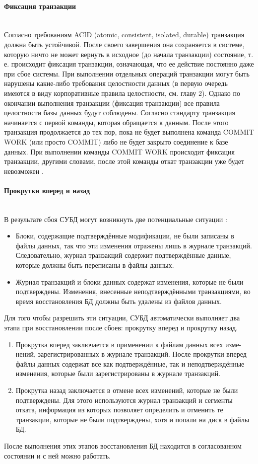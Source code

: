 \paragraph{Фиксация транзакции} ~\\
Согласно требованиям ACID (atomic, consistent, isolated, durable) транзакция должна быть устойчивой. После своего завершения она сохраняется в системе, которую ничто не может вернуть в исходное (до начала транзакции) состояние, т. е. происходит фиксация транзакции, означающая, что ее действие постоянно даже при сбое системы. При выполнении отдельных операций транзакции могут быть нарушены какие-либо требования целостности данных (в первую очередь имеются в виду корпоративные правила целостности, см. главу 2). Однако по окончании выполнения транзакции (фиксация транзакции) все правила целостности базы данных будут соблюдены.
Согласно стандарту транзакция начинается с первой команды, которая обращается к данным. После этого транзакция продолжается до тех пор, пока не будет выполнена команда COMMIT WORK (или просто COMMIT) либо не будет закрыто соединение к базе данных. При выполнении команды COMMIT WORK происходит фиксация транзакции, другими словами, после этой команды откат транзакции уже будет невозможен \autocite{Pirogov2009}.

\paragraph{Прокрутки вперед и назад} ~\\
В результате сбоя СУБД могут возникнуть две потенциальные ситуации \autocite{Karpova2009}:
\begin{itemize}
\item Блоки, содержащие подтверждённые модификации, не были записаны в
файлы данных, так что эти изменения отражены лишь в журнале транзакций. Следовательно, журнал транзакций содержит подтверждённые
данные, которые должны быть переписаны в файлы данных.
\item Журнал транзакций и блоки данных содержат изменения, которые не
были подтверждены. Изменения, внесенные неподтверждёнными
транзакциями, во время восстановления БД должны быть удалены из
файлов данных.
\end{itemize}
Для того чтобы разрешить эти ситуации, СУБД автоматически выполняет два
этапа при восстановлении после сбоев: прокрутку вперед и прокрутку назад.
\begin{enumerate}
 \item Прокрутка вперед заключается в применении к файлам данных всех
изме-нений, зарегистрированных в журнале транзакций. После прокрутки
вперед файлы данных содержат все как подтверждённые, так и
неподтверждённые изменения, которые были зарегистрированы в
журнале транзакций.
 \item Прокрутка назад заключается в отмене всех изменений, которые не были
подтверждены. Для этого используются журнал транзакций и сегменты
отката, информация из которых позволяет определить и отменить те
транзакции, которые не были подтверждены, хотя и попали на диск в
файлы БД.
\end{enumerate}
После выполнения этих этапов восстановления БД находится в согласованном
состоянии и с ней можно работать.

